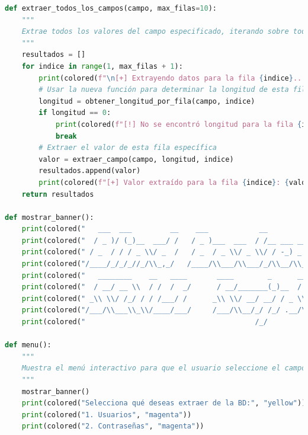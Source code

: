 \documentclass[a4paper,12pt]{article}
\begin{document}
\begin{lstlisting}[language=Python, basicstyle=\ttfamily\footnotesize]
def extraer_todos_los_campos(campo, max_filas=10):
    """
    Extrae todos los valores del campo especificado, iterando sobre todas las filas de la tabla.
    """
    resultados = []
    for indice in range(1, max_filas + 1):
        print(colored(f"\n[+] Extrayendo datos para la fila {indice}...", "yellow"))
        # Usar la nueva función para determinar la longitud de esta fila específica
        longitud = obtener_longitud_por_fila(campo, indice)
        if longitud == 0:
            print(colored(f"[!] No se encontró longitud para la fila {indice}. Asumiendo fin de datos.", "red"))
            break
        # Extraer el valor de esta fila específica
        valor = extraer_campo(campo, longitud, indice)
        resultados.append(valor)
        print(colored(f"[+] Valor extraído para la fila {indice}: {valor}", "green"))
    return resultados

def mostrar_banner():
    print(colored("   ___  ___         __    ___            __            ", "cyan"))
    print(colored("  / _ )/ (_)__  ___/ /   / _ )___  ___  / /__ ___ ____ ", "cyan"))
    print(colored(" / _  / / / _ \\/ _  /   / _  / _ \\/ _ \\/ / -_) _ `/ _ \\", "cyan"))
    print(colored("/____/_/_/_//_/\\_,_/   /____/\\___/\\___/_/\\__/\\_,_/_//_/", "cyan"))
    print(colored("   ________    __   ____       ____        _      __      ", "yellow"))
    print(colored("  / __/ __ \\  / /  /  _/      / __/_______(_)__  / /_     ", "yellow"))
    print(colored(" _\\ \\/ /_/ / / /___/ /      _\\ \\/ __/ __/ / _ \\/ __/     ", "yellow"))
    print(colored("/___/\\___\\_\\/____/___/     /___/\\__/_/ /_/ .__/\\__/      ", "yellow"))
    print(colored("                                        /_/             ", "yellow"))

def menu():
    """
    Muestra el menú interactivo para que el usuario seleccione el campo a extraer.
    """
    mostrar_banner()
    print(colored("Selecciona qué deseas extraer de la BD:", "yellow"))
    print(colored("1. Usuarios", "magenta"))
    print(colored("2. Contraseñas", "magenta"))


\end{lstlisting}
\end{document}
